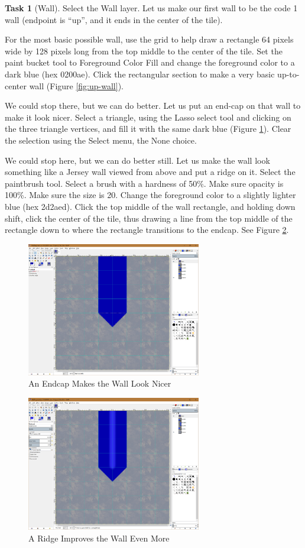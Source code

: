 \documentclass[12pt]{amsbook}
\theoremstyle{definition}
\newtheorem{task}[exercise]{Task}
\theoremstyle{remark}
\numberwithin{figure}{chapter}
\numberwithin{table}{chapter}
\numberwithin{section}{chapter}
\numberwithin{equation}{section}
\begin{document}
\begin{task}[Wall]
Select the Wall layer.  Let us make our first wall to be the code 1 wall (endpoint is ``up'', and it ends in the center of the tile).  

For the most basic possible wall, use the grid to help draw a rectangle 64 pixels wide by 128 pixels long from the top middle to the center of the tile.  Set the paint bucket tool to Foreground Color Fill and change the foreground color to a dark blue (hex 0200ae).  Click the rectangular section to make a very basic up-to-center wall (Figure \ref{fig:up-wall}).

We could stop there, but we can do better.  Let us put an end-cap on that wall to make it look nicer.  Select a triangle, using the Lasso select tool and clicking on the three triangle vertices, and fill it with the same dark blue (Figure \ref{fig:endcap}).  Clear the selection using the Select menu, the None choice.

We could stop here, but we can do better still.  Let us make the wall look something like a Jersey wall viewed from above and put a ridge on it.  Select the paintbrush tool.  Select a brush with a hardness of 50\%.  Make sure opacity is 100\%.  Make sure the size is 20.  Change the foreground color to a slightly lighter blue (hex 2d2aed).  Click the top middle of the wall rectangle, and holding down shift, click the center of the tile, thus drawing a line from the top middle of the rectangle down to where the rectangle transitions to the endcap.  See Figure \ref{fig:wall-complete}.
\end{task}

\begin{figure}[h]
  \includegraphics[width=3in]{EndCap.png}
  \caption{An Endcap Makes the Wall Look Nicer}
  \label{fig:endcap}
\end{figure}


\begin{figure}[h]
  \includegraphics[width=3in]{WallComplete.png}
  \caption{A Ridge Improves the Wall Even More}
  \label{fig:wall-complete}
\end{figure}
\end{document}
